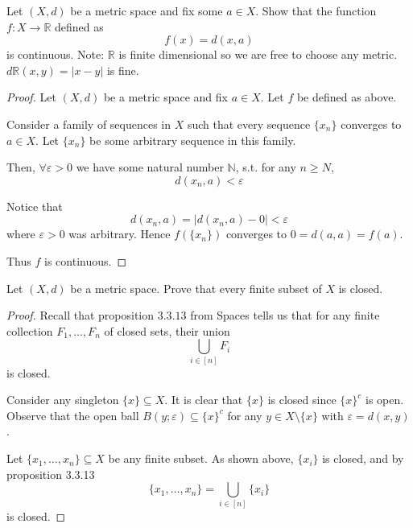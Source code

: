 \begin{prob}[3.2.5 Spaces]
    Let $(X,d)$ be a metric space and fix some $a \in X$. 
    Show that the function $f:X \to \mathbb R$ defined as 
    \[
        f(x) = d(x,a)
    \]
    is continuous. 
    Note: $\mathbb R$ is finite dimensional so we are free 
    to choose any metric. $d{\mathbb R}(x,y) = |x-y|$ is fine.
\end{prob}
\begin{proof}
    Let $(X,d)$ be a metric space and fix $a \in X$. 
    Let $f$ be defined as above. 

    Consider a family of sequences in $X$ such that every sequence 
    $\{x_n\}$ converges to $a \in X$. Let $\{x_n\}$ be some arbitrary
    sequence in this family.

    Then, $\forall \varepsilon > 0$ we have some natural number 
    $\mathbb N$, s.t. for any $n \geq N$,
    \[
        d(x_n, a) < \varepsilon
    \]

    Notice that 
    \[
        d(x_n,a) = |d(x_n,a) - 0| < \varepsilon
    \]
    where $\varepsilon > 0$ was arbitrary. Hence 
    $f(\{x_n\})$ converges to $0 = d(a,a) = f(a)$. 

    Thus $f$ is continuous.
\end{proof}
\begin{prob}
    Let $(X,d)$ be a metric space. Prove that every finite 
    subset of $X$ is closed. 
\end{prob}
\begin{proof}
    Recall that proposition $3.3.13$ from Spaces tells us that 
    for any finite collection $F_1, \ldots, F_n$ of closed sets, 
    their union 
    \[
        \bigcup_{i \in [n]} F_i
    \]
    is closed. 

    Consider any singleton $\{x\} \subseteq X$. It is clear that 
    $\{x\}$ is closed since $\{x\}^c$ is open. Observe that 
    the open ball $B(y;\varepsilon) \subseteq \{x\}^c$ for any 
    $y \in X \setminus \{x\}$ with $\varepsilon = d(x,y)$.
    
    Let $\{x_1,\ldots,x_n\} \subseteq X$ be any finite subset. As 
    shown above, $\{x_i\}$ is closed, and by proposition 3.3.13 
    \[
        \{x_1,\ldots,x_n\} = \bigcup_{i\in[n]} \{x_i\}
    \] 
    is closed. 
\end{proof}

